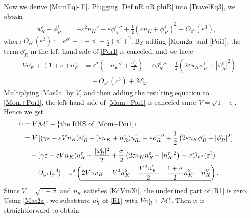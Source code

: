 \documentclass{amsart}
\newcommand{\veps}{\varepsilon}
\numberwithin{equation}{section}
\theoremstyle{plain}%
\theoremstyle{definition}
\theoremstyle{remark}
\theoremstyle{remark}
\begin{document}
Now we derive \eqref{MainEq}-\eqref{F}. Plugging \eqref{Def nR uR phiR} into \eqref{TravelEq3}, we obtain
\begin{equation}\label{Poi1}
\begin{split}
n_{R}^{\veps} - \phi_R^{\veps}
& = -\veps^2n_K'' - \veps {\phi_{R}^{\veps}}''   +\frac{1}{2}(\veps n_K + \phi_{R}^{\veps})^2 + O_{\phi^\veps}(\veps^3) ,
\end{split}
\end{equation}
where $O_{\phi^\veps}(\veps^3) :=  e^{\phi^\veps} - 1 - \phi^\veps - \frac{1}{2}(\phi^\veps)^2$. 
By adding \eqref{Mom2a} and \eqref{Poi1}, the term $\phi_{R}^{\veps}$ in the left-hand side of \eqref{Poi1} is canceled, and we have
\begin{equation}\label{Mom+Poi1}
\begin{split}
-Vu_R^{\veps} + (1+\sigma)n_R^{\veps} 
& = \veps^2\left( -n_K'' + \frac{n_K^2}{2} \right) - \veps {\phi_{R}^{\veps}}''  + \frac{1}{2}\left( 2\veps n_K\phi_R^{\veps} + |\phi_R^{\veps}|^2 \right)\\
& \quad  + O_{\phi^\veps}(\veps^3) + \mathcal{M}_2^\veps.
\end{split}
\end{equation}
Multiplying \eqref{Mas2a} by $V$, and then adding the resulting equation to \eqref{Mom+Poi1}, the left-hand side of \eqref{Mom+Poi1} is canceled since $V=\sqrt{1+\sigma}$. Hence we get
\begin{equation}\label{R1}
\begin{split}
0 & = V\mathcal{M}_1^\veps + \{\text{the RHS of \eqref{Mom+Poi1}} \}\\
& = V\left[(\gamma\veps -\veps Vn_K) n_{R}^{\veps} - (\veps n_K + n_{R}^{\veps})u_{R}^{\veps} \right]  - \veps{\phi_R^{\veps}}'' + \frac{1}{2}\left( 2\veps n_K\phi_R^{\veps} + |\phi_R^{\veps}|^2 \right)  \\
& \quad +(\gamma\veps  - \veps Vn_K )u_R^{\veps} - \frac{|u_R^{\veps}|^2}{2} + \frac{\sigma}{2}\left(2\veps n_K n_R^{\veps} + |n_R^{\veps}|^2  \right)  -\sigma O_{n^\veps}(\veps^3)  \\
& \quad + O_{\phi^\veps}(\veps^3) + \veps^2 \left( \underline{ 2V\gamma n_K - V^2n_K^2  -\frac{V^2n_K^2}{2} + \frac{1+\sigma}{2}n_K^2 -n_K'' } \right).
\end{split}
\end{equation}
Since $V=\sqrt{1+\sigma}$ and $n_K$ satisfies \eqref{KdVinXi}, the underlined part of \eqref{R1} is zero. Using \eqref{Mas2a}, we substitute $u_R^{\veps}$ of \eqref{R1} with $Vn_R^{\veps}+\mathcal{M}_1^\veps$. Then it is straightforward to obtain
\end{document}
